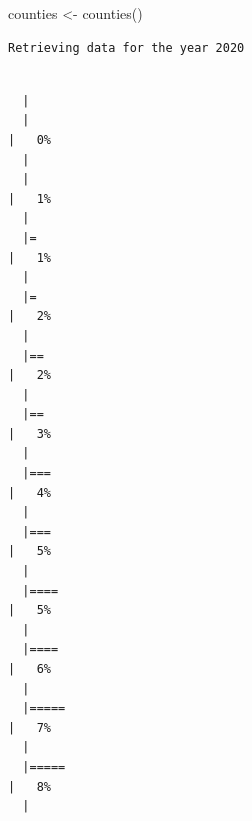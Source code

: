 \documentclass[
  letterpaper,
  DIV=11,
  numbers=noendperiod]{scrreprt}
\newenvironment{Shaded}{\begin{snugshade}}{\end{snugshade}}
\newcommand{\FunctionTok}[1]{\textcolor[rgb]{0.28,0.35,0.67}{#1}}
\newcommand{\NormalTok}[1]{\textcolor[rgb]{0.00,0.23,0.31}{#1}}
\newcommand{\OtherTok}[1]{\textcolor[rgb]{0.00,0.23,0.31}{#1}}
\begin{document}
\begin{Shaded}
\begin{Highlighting}[]
\NormalTok{counties }\OtherTok{\textless{}{-}} \FunctionTok{counties}\NormalTok{()}
\end{Highlighting}
\end{Shaded}

\begin{verbatim}
Retrieving data for the year 2020
\end{verbatim}

\begin{verbatim}

  |                                                                            
  |                                                                      |   0%
  |                                                                            
  |                                                                      |   1%
  |                                                                            
  |=                                                                     |   1%
  |                                                                            
  |=                                                                     |   2%
  |                                                                            
  |==                                                                    |   2%
  |                                                                            
  |==                                                                    |   3%
  |                                                                            
  |===                                                                   |   4%
  |                                                                            
  |===                                                                   |   5%
  |                                                                            
  |====                                                                  |   5%
  |                                                                            
  |====                                                                  |   6%
  |                                                                            
  |=====                                                                 |   7%
  |                                                                            
  |=====                                                                 |   8%
  |                                                                            

\end{verbatim}
\end{document}
